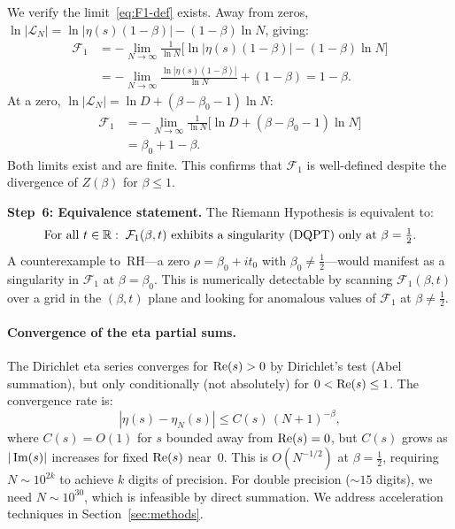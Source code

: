 We verify the limit~\eqref{eq:F1-def} exists. Away from zeros,
$\ln|\mathcal{L}_N| = \ln|\eta(s)(1-\beta)| - (1-\beta)\ln N$, giving:
\begin{align}
  \mathcal{F}_1 &= -\lim_{N\to\infty}\frac{1}{\ln N}
    \bigl[\ln|\eta(s)(1-\beta)| - (1-\beta)\ln N\bigr] \nonumber\\
  &= -\lim_{N\to\infty}\frac{\ln|\eta(s)(1-\beta)|}{\ln N} + (1-\beta)
    = 1-\beta. \label{eq:F1-away}
\end{align}
At a zero, $\ln|\mathcal{L}_N| = \ln D + (\beta-\beta_0-1)\ln N$:
\begin{align}
  \mathcal{F}_1 &= -\lim_{N\to\infty}\frac{1}{\ln N}
    \bigl[\ln D + (\beta-\beta_0-1)\ln N\bigr] \nonumber\\
  &= \beta_0 + 1 - \beta. \label{eq:F1-zero}
\end{align}
Both limits exist and are finite. This confirms that $\mathcal{F}_1$ is well-defined
despite the divergence of $Z(\beta)$ for $\beta \le 1$.

\medskip\noindent
\textbf{Step~6: Equivalence statement.} The Riemann Hypothesis is equivalent to:
\begin{equation}\label{eq:rh-dqpt-equiv}
  \text{For all } t \in \mathbb{R}:\;
  \mathcal{F}_1(\beta,t) \text{ exhibits a singularity (DQPT) only at }
  \beta = \tfrac{1}{2}.
\end{equation}
A counterexample to~RH---a zero $\rho = \beta_0 + it_0$ with
$\beta_0 \ne \tfrac{1}{2}$---would manifest as a singularity in $\mathcal{F}_1$ at
$\beta = \beta_0$. This is numerically detectable by scanning $\mathcal{F}_1(\beta,t)$
over a grid in the $(\beta,t)$ plane and looking for anomalous values of
$\mathcal{F}_1$ at $\beta \ne \tfrac{1}{2}$.

\paragraph{Convergence of the eta partial sums.}
The Dirichlet eta series converges for $\operatorname{Re}(s) > 0$ by Dirichlet's test (Abel
summation), but only conditionally (not absolutely) for $0 < \operatorname{Re}(s) \le 1$. The
convergence rate is:
\begin{equation}\label{eq:eta-remainder}
  |\eta(s) - \eta_N(s)| \le C(s)\,(N+1)^{-\beta},
\end{equation}
where $C(s) = O(1)$ for $s$ bounded away from $\operatorname{Re}(s) = 0$, but $C(s)$ grows as
$|\operatorname{Im}(s)|$ increases for fixed $\operatorname{Re}(s)$ near~0. This is $O(N^{-1/2})$ at
$\beta = \tfrac{1}{2}$, requiring $N \sim 10^{2k}$ to achieve $k$ digits of precision.
For double precision (${\sim}15$ digits), we need $N \sim 10^{30}$, which is infeasible
by direct summation. We address acceleration techniques in Section~\ref{sec:methods}.

